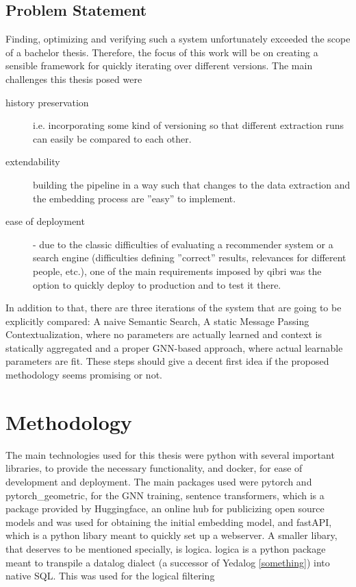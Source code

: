\documentclass[draft,final]{vutinfth} %
\begin{document}
\section{Problem Statement}
Finding, optimizing and verifying such a system unfortunately exceeded the scope of a bachelor thesis. Therefore, the focus of this work will be on creating a sensible framework for quickly iterating over different versions. The main challenges this thesis posed were
\begin{description}

    \item[history preservation] i.e. incorporating some kind of versioning so that different extraction runs can easily be compared to each other.
    \item[extendability] building the pipeline in a way such that changes to the data extraction and the embedding process are ''easy'' to implement.
    \item[ease of deployment] - due to the classic difficulties of evaluating a recommender system or a search engine (difficulties defining ''correct'' results, relevances for different people, etc.), one of the main requirements imposed by qibri was the option to quickly deploy to production and to test it there.
\end{description}
In addition to that, there are three iterations of the system that are going to be explicitly compared: A naive Semantic Search, A static Message Passing Contextualization, where no parameters are actually learned and context is statically aggregated and a proper GNN-based approach, where actual learnable parameters are fit. These steps should give a decent first idea if the proposed methodology seems promising or not.


\chapter{Methodology}
The main technologies used for this thesis were python with several important libraries, to provide the necessary functionality, and docker, for ease of development and deployment. The main packages used were pytorch and pytorch\_geometric, for the GNN training, sentence transformers, which is a package provided by Huggingface, an online hub for publicizing open source models and was used for obtaining the initial embedding model, and fastAPI, which is a python libary meant to quickly set up a webserver.
A smaller libary, that deserves to be mentioned specially, is logica. logica is a python package meant to transpile a datalog dialect (a successor of Yedalog \ref{something}) into native SQL. This was used for the logical filtering
\end{document}
